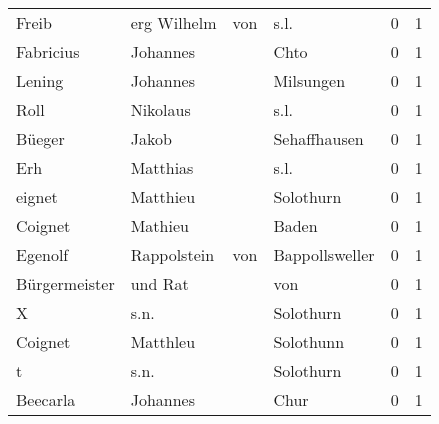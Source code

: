 \documentclass[10pt,a4paper,landscape]{article}
\begin{document}
\begin{longtable}{llllrr}
                    Freib &                        erg Wilhelm &         von &                                        s.l. &          0 &         1 \\
                Fabricius &                           Johannes &             &                                        Chto &          0 &         1 \\
                   Lening &                           Johannes &             &                                   Milsungen &          0 &         1 \\
                     Roll &                           Nikolaus &             &                                        s.l. &          0 &         1 \\
                   Büeger &                              Jakob &             &                                Sehaffhausen &          0 &         1 \\
                      Erh &                           Matthias &             &                                        s.l. &          0 &         1 \\
                   eignet &                           Matthieu &             &                                   Solothurn &          0 &         1 \\
                  Coignet &                            Mathieu &             &                                       Baden &          0 &         1 \\
                  Egenolf &                        Rappolstein &         von &                              Bappollsweller &          0 &         1 \\
            Bürgermeister &                            und Rat &             &                                         von &          0 &         1 \\
                        X &                               s.n. &             &                                   Solothurn &          0 &         1 \\
                  Coignet &                           Matthleu &             &                                   Solothunn &          0 &         1 \\
                        t &                               s.n. &             &                                   Solothurn &          0 &         1 \\
                 Beecarla &                           Johannes &             &                                        Chur &          0 &         1 \\

\end{longtable}
\end{document}
